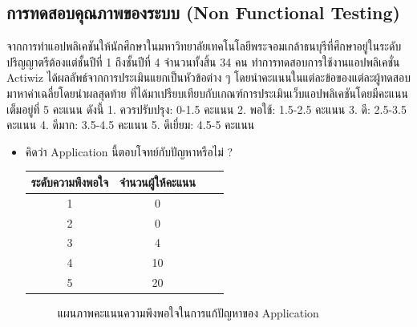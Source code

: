 \documentclass[14pt,oneside,openright,a4paper]{cpe-thai-project}
\begin{document}
\newpage

\subsection{การทดสอบคุณภาพของระบบ (Non Functional Testing)}
จากการทําแอปพลิเคชันให้นักศึกษาในมหาวิทยาลัยเทคโนโลยีพระจอมเกล้าธนบุรีที่ศึกษาอยู่ในระดับปริญญาตรีต้องแต่ชั้นปีที่ 1 ถึงชั้นปีที่ 4 จำนวนทั้งสิ้น 34 คน ทำการทดสอบการใช้งานแอปพลิเคชั่น Actiwiz ได้ผลลัพธ์จากการประเมินแยกเป็นหัวข้อต่าง ๆ โดยนําคะแนนในแต่ละข้อของแต่ละผู้ทดสอบมาหาค่าเฉลี่ยโดยนําผลสุดท้าย
ที่ได้มาเปรียบเทียบกับเกณฑ์การประเมินเว็บแอปพลิเคชันโดยมีคะแนนเต็มอยู่ที่ 5 คะแนน ดังนี้
1. ควรปรับปรุง: 0-1.5 คะแนน
2. พอใช้: 1.5-2.5 คะแนน
3. ดี: 2.5-3.5 คะแนน
4. ดีมาก: 3.5-4.5 คะแนน
5. ดีเยี่ยม: 4.5-5 คะแนน

\begin{itemize}
  \item คิดว่า Application นี้ตอบโจทย์กับปัญหาหรือไม่ ?
  \begin{table}[!h]
    \centering
    \captionsetup{justification=centering} %
    \begin{tabular}{|c|c|c|c|}
      \hline
      \multicolumn{1}{|c|}{\cellcolor[HTML]{9FC5E8}ระดับความพึงพอใจ} &
        \multicolumn{1}{c|}{\cellcolor[HTML]{9FC5E8}จำนวนผู้ให้คะแนน} \\ \hline
       1 & 0
         \\ \hline 
       2 & 0
         \\ \hline 
       3 & 4
         \\ \hline 
       4 & 10
         \\ \hline 
       5 & 20
         \\ \hline
    \end{tabular}
    \label{tab:Problemssolvingsatisfaction}
  \end{table}
  \begin{figure}[!h]\centering
    \setlength{\fboxrule}{0.5mm} %
    \setlength{\fboxsep}{0.5cm}
    \caption{แผนภาพคะแนนความพึงพอใจในการแก้ปัญหาของ Application}\label{fig:NotificationTest}
  \end{figure}
\end{itemize}
\end{document}
